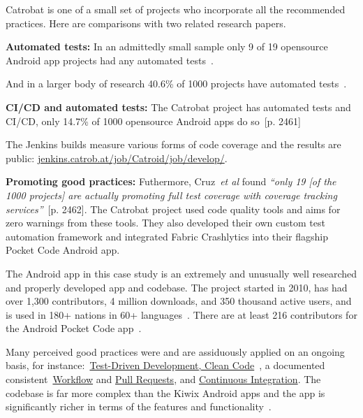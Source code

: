 \begin{kaobox}[frametitle=Ranking Catrobat's development practices]
Catrobat is one of a small set of projects who incorporate all the recommended practices. Here are comparisons with two related research papers.

\textbf{Automated tests:} In an admittedly small sample only 9 of 19 opensource Android app projects had any automated tests~. 

And in a larger body of research 40.6\% of 1000 projects have automated tests~. 

\textbf{CI/CD and automated tests:} 
The Catrobat project has automated tests and CI/CD, only 14.7\% of 1000 opensource Android apps do so~[p. 2461]~

The Jenkins builds measure various forms of code coverage and the results are public: \href{https://jenkins.catrob.at/job/Catroid/job/develop/}{jenkins.catrob.at/job/Catroid/job/develop/}.

\textbf{Promoting good practices:} 
Futhermore, Cruz~\emph{et al} found \emph{``only 19 [of the 1000 projects] are actually promoting full test coverage with coverage tracking services''}~[p. 2462]. The Catrobat project used code quality tools and aims for zero warnings from these tools. They also developed their own custom test automation framework and integrated Fabric Crashlytics into their flagship Pocket Code Android app.

\end{kaobox}


The Android app in this case study is an extremely and unusually well researched and properly developed app and codebase. The project started in 2010, has had over 1,300 contributors, 4 million downloads, and 350 thousand active users, and is used in 180+ nations in 60+ languages~. There are at least 216 contributors for the Android Pocket Code app~.

Many perceived good practices were and are assiduously applied on an ongoing basis, for instance:~\href{https://github.com/Catrobat/Catroid}{Test-Driven Development, Clean Code}~, a documented consistent~\href{https://github.com/Catrobat/Catroid/wiki/Workflow}{Workflow} and \href{https://github.com/Catrobat/Catroid/wiki/Creating-a-pull-request}{Pull Requests}, and \href{https://jenkins.catrob.at/job/Catroid/}{Continuous Integration}. The codebase is far more complex than the Kiwix Android apps and the app is significantly richer in terms of the features and functionality~.




